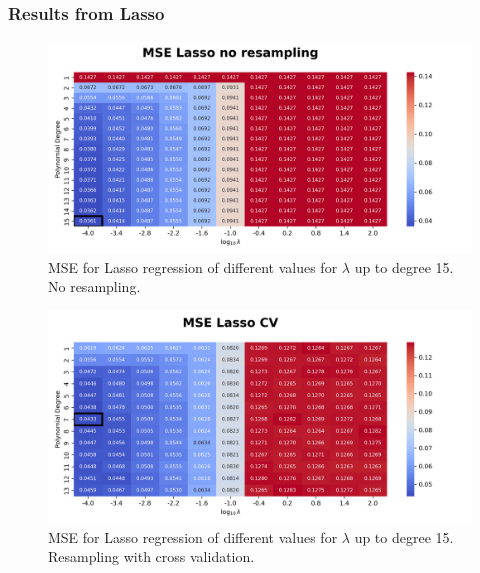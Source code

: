 \documentclass{article}
\begin{document}
\newpage
\subsubsection{Results from Lasso}
\begin{figure}[htbp]
    \centering
    \includegraphics[width=\textwidth]{Project1/figures/Franke/Heatmap_MSE_Lasso_no_resampling.png}
    \caption{MSE for Lasso regression of different values for $\lambda$ up to degree 15. No resampling.}
    \label{fig:LassoNoResamp}
\end{figure}

\begin{figure}[htbp]
    \centering
    \includegraphics[width=\textwidth]{Project1/figures/Franke/Heatmap_MSE_Lasso_CV.png}
    \caption{MSE for Lasso regression of different values for $\lambda$ up to degree 15. Resampling with cross validation.}
    \label{fig:LassoCV}
\end{figure}
\end{document}
